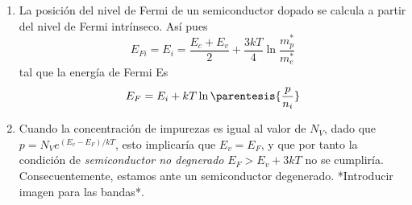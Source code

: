 \begin{enumerate}[label=\alph*)]
		\item La posición del nivel de Fermi de un semiconductor dopado se calcula a partir del nivel de Fermi intrínseco. Así pues
		\begin{equation}
			E_{Fi} = E_i = \frac{E_c+E_v}{2} + \frac{3 kT}{4} \ln \frac{m_p^*}{m_e^*}
		\end{equation}
		tal que la energía de Fermi Es
		\begin{equation}
			E_F = E_i + kT \ln \parentesis{\frac{p}{n_i}}
		\end{equation}
		
		\item Cuando la concentración de impurezas es igual al valor de $N_V$, dado que $p=N_V e^{(E_v-E_F)/kT}$, esto implicaría que $E_v = E_F$, y que por tanto la condición de \textit{semiconductor no degnerado} $E_F>E_v + 3kT$ no se cumpliría. Consecuentemente, estamos ante un semiconductor degenerado. *Introducir imagen para las bandas*.
	\end{enumerate}
